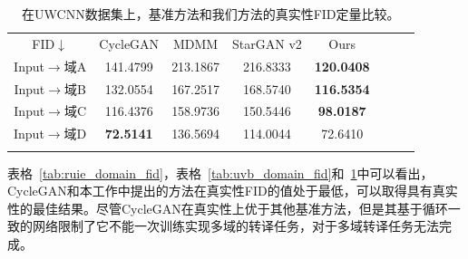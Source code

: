 \begin{table}[ht]
\centering
\caption{在UWCNN数据集上，基准方法和我们方法的真实性FID定量比较。}
  \begin{tabular}{c|ccccccc}
    \hline\noalign{\smallskip}
    FID$\downarrow$ & CycleGAN & MDMM & StarGAN v2 & Ours \\
    \noalign{\smallskip}\hline\noalign{\smallskip}
    Input$\rightarrow$域A & 141.4799 & 213.1867 & 216.8333 & \textbf{120.0408}  \\
    Input$\rightarrow$域B & 132.0554 & 167.2517 & 168.5740 & \textbf{116.5354}  \\
    Input$\rightarrow$域C & 116.4376 & 158.9736 & 150.5446 & \textbf{98.0187}  \\
    Input$\rightarrow$域D & \textbf{72.5141}  & 136.5694 & 114.0044 & 72.6410  \\
    \noalign{\smallskip}\hline
  \end{tabular}
  \label{tab:uwcnn_domain_fid}
\end{table}

表格~\ref{tab:ruie_domain_fid}，表格~\ref{tab:uvb_domain_fid}和~\ref{tab:uwcnn_domain_fid}中可以看出，CycleGAN和本工作中提出的方法在真实性FID的值处于最低，可以取得具有真实性的最佳结果。尽管CycleGAN在真实性上优于其他基准方法，但是其基于循环一致的网络限制了它不能一次训练实现多域的转译任务，对于多域转译任务无法完成。

